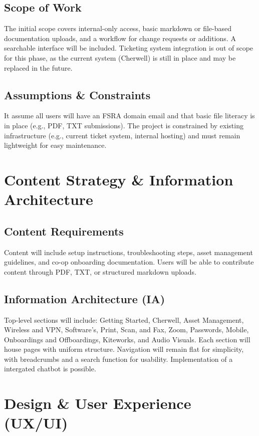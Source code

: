 \documentclass[11pt,a4paper]{article}
\begin{document}
\subsection{Scope of Work}
The initial scope covers internal-only access, basic markdown or file-based documentation uploads, and a workflow for change requests or additions. A searchable interface will be included. Ticketing system integration is out of scope for this phase, as the current system (Cherwell) is still in place and may be replaced in the future.

\subsection{Assumptions \& Constraints}
It assume all users will have an FSRA domain email and that basic file literacy is in place (e.g., PDF, TXT submissions). The project is constrained by existing infrastructure (e.g., current ticket system, internal hosting) and must remain lightweight for easy maintenance.

\section{Content Strategy \& Information Architecture}

\subsection{Content Requirements}
Content will include setup instructions, troubleshooting steps, asset management guidelines, and co-op onboarding documentation. Users will be able to contribute content through PDF, TXT, or structured markdown uploads.

\subsection{Information Architecture (IA)}
Top-level sections will include: Getting Started, Cherwell, Asset Management, Wireless and VPN, Software's, Print, Scan, and Fax, Zoom, Passwords, Mobile, Onboardings and Offboardings, Kiteworks, and Audio Visuals. Each section will house pages with uniform structure. Navigation will remain flat for simplicity, with breadcrumbs and a search function for usability. Implementation of a intergated chatbot is possible.

\section{Design \& User Experience (UX/UI)}
\end{document}
